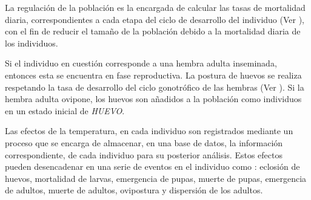 La regulación de la población es la encargada de calcular las tasas de mortalidad diaria,
correspondientes a cada etapa del ciclo de desarrollo del individuo (Ver
), con el fin de reducir el tamaño de la población debido a la
mortalidad diaria de los individuos.

Si el individuo en cuestión corresponde a una hembra adulta inseminada, entonces esta se encuentra
en fase reproductiva. La postura de huevos se realiza respetando la tasa de desarrollo del ciclo
gonotrófico de las hembras (Ver ). Si la hembra
adulta ovipone, los huevos son añadidos a la población como individuos en un estado inicial de
\textit{HUEVO}.

Las efectos de la temperatura, en cada individuo son registrados mediante un proceso que se
encarga de almacenar, en una base de datos, la información correspondiente, de cada individuo para
su posterior análisis. Estos efectos pueden desencadenar en una serie de eventos en el individuo
como : eclosión de huevos, mortalidad de larvas, emergencia de pupas, muerte de pupas, emergencia
de adultos, muerte de adultos, ovipostura y dispersión de los adultos.
